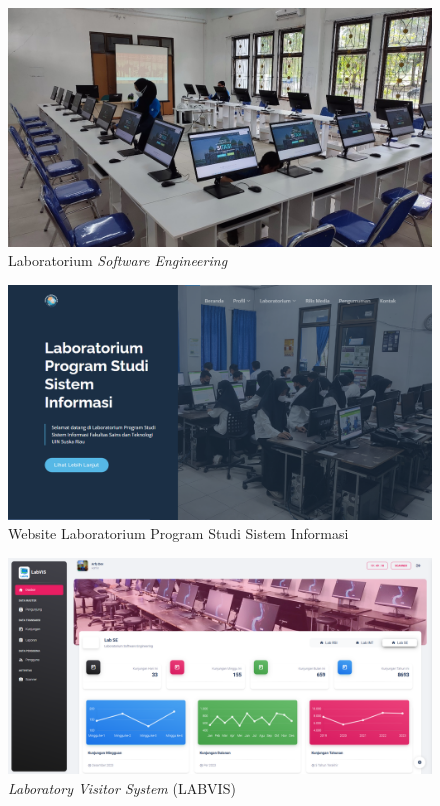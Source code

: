 \begin{figure}[h]
	\centering
	\includegraphics[width=0.82\linewidth]{konten/gambar/lab-se.jpg}
	\caption{Laboratorium \textit{Software Engineering} \protect\cite{labsi2023}}
	\label{fig:lab-se-bab2}
\end{figure}

\begin{figure}[h]
	\centering
	\includegraphics[width=0.82\linewidth]{konten//gambar/labsi.png}
	\caption{Website Laboratorium Program Studi Sistem Informasi \protect\cite{web-prodi}}
	\label{fig:labsi-website-bab2}
\end{figure}

\begin{figure}[h]
	\centering
	\includegraphics[width=0.82\linewidth]{konten//gambar/labvis.png}
	\caption{\textit{Laboratory Visitor System} (LABVIS) \protect\cite{web-prodi}}
	\label{fig:labvis-bab2}
\end{figure}


